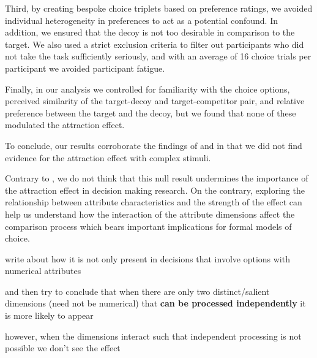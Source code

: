 \documentclass[12pt, a4paper]{article}
\begin{document}
Third, by creating bespoke choice triplets based on preference ratings, we avoided individual heterogeneity in preferences to act as a potential confound. In addition, we ensured that the decoy is not too desirable in comparison to the target. We also used a strict exclusion criteria to filter out participants who did not take the task sufficiently seriously, and with an average of 16 choice trials per participant we avoided participant fatigue.


Finally, in our analysis we controlled for familiarity with the choice options, perceived similarity of the target-decoy and target-competitor pair, and relative preference between the target and the decoy, but we found that none of these modulated the attraction effect.


To conclude, our results corroborate the findings of \citeauthor{Frederick2014} and \citeauthor{Yang2014} in that we did not find evidence for the attraction effect with complex stimuli. 


Contrary to \citeauthor{Frederick2014}, we do not think that this null result undermines the importance of the attraction effect in decision making research. On the contrary, exploring the relationship between attribute characteristics and the strength of the effect can help us understand how the interaction of the attribute dimensions affect the comparison process which bears important implications for formal models of choice.

write about how it is not only present in decisions that involve options with numerical attributes

and then try to conclude that when there are only two distinct/salient dimensions (need not be numerical) that \textbf{can be processed independently} it is more likely to appear

however, when the dimensions interact such that independent processing is not possible we don't see the effect

  




\newpage







 
\end{document}
